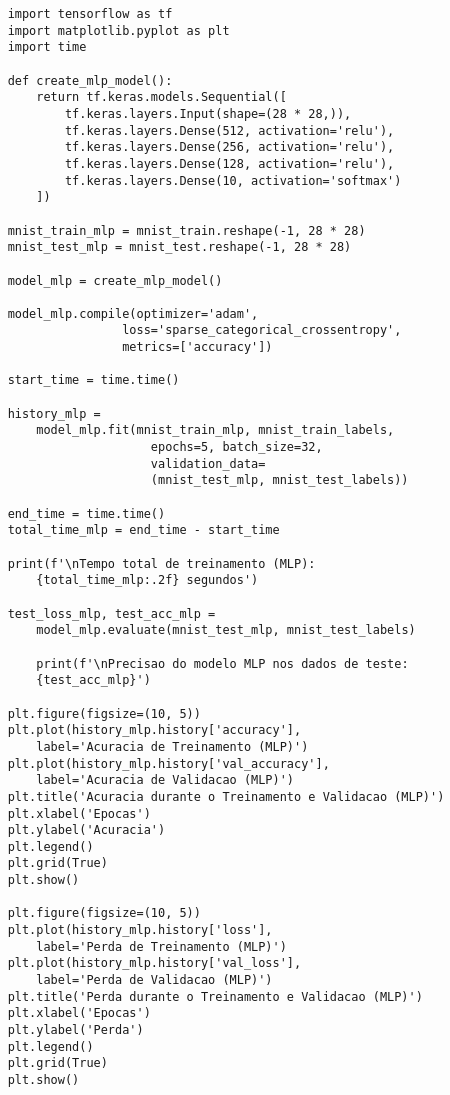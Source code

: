 \begin{lstlisting}
    import tensorflow as tf
    import matplotlib.pyplot as plt
    import time

    def create_mlp_model():
        return tf.keras.models.Sequential([
            tf.keras.layers.Input(shape=(28 * 28,)),
            tf.keras.layers.Dense(512, activation='relu'),
            tf.keras.layers.Dense(256, activation='relu'),
            tf.keras.layers.Dense(128, activation='relu'),
            tf.keras.layers.Dense(10, activation='softmax')
        ])

    mnist_train_mlp = mnist_train.reshape(-1, 28 * 28)
    mnist_test_mlp = mnist_test.reshape(-1, 28 * 28)

    model_mlp = create_mlp_model()

    model_mlp.compile(optimizer='adam',
                    loss='sparse_categorical_crossentropy',
                    metrics=['accuracy'])

    start_time = time.time()

    history_mlp = 
        model_mlp.fit(mnist_train_mlp, mnist_train_labels,
                        epochs=5, batch_size=32,
                        validation_data=
                        (mnist_test_mlp, mnist_test_labels))

    end_time = time.time()
    total_time_mlp = end_time - start_time
    
    print(f'\nTempo total de treinamento (MLP): 
        {total_time_mlp:.2f} segundos')

    test_loss_mlp, test_acc_mlp = 
        model_mlp.evaluate(mnist_test_mlp, mnist_test_labels)
    
        print(f'\nPrecisao do modelo MLP nos dados de teste: 
        {test_acc_mlp}')

    plt.figure(figsize=(10, 5))
    plt.plot(history_mlp.history['accuracy'], 
        label='Acuracia de Treinamento (MLP)')
    plt.plot(history_mlp.history['val_accuracy'], 
        label='Acuracia de Validacao (MLP)')
    plt.title('Acuracia durante o Treinamento e Validacao (MLP)')
    plt.xlabel('Epocas')
    plt.ylabel('Acuracia')
    plt.legend()
    plt.grid(True)
    plt.show()

    plt.figure(figsize=(10, 5))
    plt.plot(history_mlp.history['loss'], 
        label='Perda de Treinamento (MLP)')
    plt.plot(history_mlp.history['val_loss'], 
        label='Perda de Validacao (MLP)')
    plt.title('Perda durante o Treinamento e Validacao (MLP)')
    plt.xlabel('Epocas')
    plt.ylabel('Perda')
    plt.legend()
    plt.grid(True)
    plt.show()
\end{lstlisting}